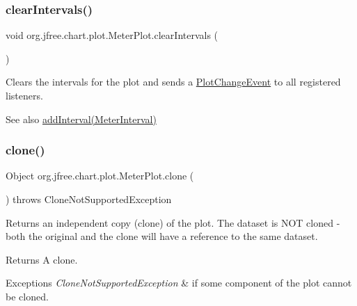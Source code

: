 \subsubsection{\texorpdfstring{clear\+Intervals()}{clearIntervals()}}
{\footnotesize\ttfamily void org.\+jfree.\+chart.\+plot.\+Meter\+Plot.\+clear\+Intervals (\begin{DoxyParamCaption}{ }\end{DoxyParamCaption})}

Clears the intervals for the plot and sends a \mbox{\hyperlink{}{Plot\+Change\+Event}} to all registered listeners.

\begin{DoxySeeAlso}{See also}
\mbox{\hyperlink{classorg_1_1jfree_1_1chart_1_1plot_1_1_meter_plot_ab60286f0f485696e89b642d0bcad3c83}{add\+Interval(\+Meter\+Interval)}} 
\end{DoxySeeAlso}
\mbox{\label{classorg_1_1jfree_1_1chart_1_1plot_1_1_meter_plot_aabc8e0f03b67fbd36a03d98cea46da40}} 
\subsubsection{\texorpdfstring{clone()}{clone()}}
{\footnotesize\ttfamily Object org.\+jfree.\+chart.\+plot.\+Meter\+Plot.\+clone (\begin{DoxyParamCaption}{ }\end{DoxyParamCaption}) throws Clone\+Not\+Supported\+Exception}

Returns an independent copy (clone) of the plot. The dataset is N\+OT cloned -\/ both the original and the clone will have a reference to the same dataset.

\begin{DoxyReturn}{Returns}
A clone.
\end{DoxyReturn}

\begin{DoxyExceptions}{Exceptions}
{\em Clone\+Not\+Supported\+Exception} & if some component of the plot cannot be cloned. \\
\hline
\end{DoxyExceptions}
\mbox{\label{classorg_1_1jfree_1_1chart_1_1plot_1_1_meter_plot_ab5c4f46ac19c288a102da153e691d2f0}} 
